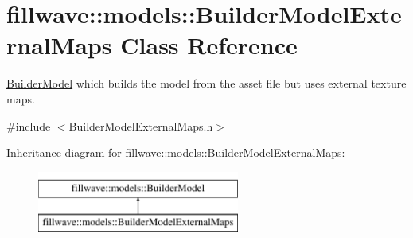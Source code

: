 \hypertarget{classfillwave_1_1models_1_1BuilderModelExternalMaps}{}\section{fillwave\+:\+:models\+:\+:Builder\+Model\+External\+Maps Class Reference}
\label{classfillwave_1_1models_1_1BuilderModelExternalMaps}


\hyperlink{classfillwave_1_1models_1_1BuilderModel}{Builder\+Model} which builds the model from the asset file but uses external texture maps.  




{\ttfamily \#include $<$Builder\+Model\+External\+Maps.\+h$>$}

Inheritance diagram for fillwave\+:\+:models\+:\+:Builder\+Model\+External\+Maps\+:\begin{figure}[H]
\begin{center}
\leavevmode
\includegraphics[height=2.000000cm]{classfillwave_1_1models_1_1BuilderModelExternalMaps}
\end{center}
\end{figure}

